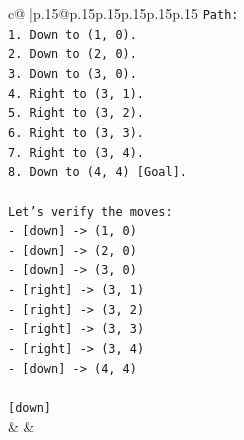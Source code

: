 \documentclass{article}
\begin{document}
{\begin{supertabular}{c@{$\;$}|p{.15\linewidth}@{}p{.15\linewidth}p{.15\linewidth}p{.15\linewidth}p{.15\linewidth}p{.15\linewidth}}
{{{\texttt{Path:} \\
\texttt{1. Down to (1, 0).} \\
\texttt{2. Down to (2, 0).} \\
\texttt{3. Down to (3, 0).} \\
\texttt{4. Right to (3, 1).} \\
\texttt{5. Right to (3, 2).} \\
\texttt{6. Right to (3, 3).} \\
\texttt{7. Right to (3, 4).} \\
\texttt{8. Down to (4, 4) {[}Goal{]}.} \\
\\ 
\texttt{Let's verify the moves:} \\
\texttt{{-} {[}down{]} {-}> (1, 0)} \\
\texttt{{-} {[}down{]} {-}> (2, 0)} \\
\texttt{{-} {[}down{]} {-}> (3, 0)} \\
\texttt{{-} {[}right{]} {-}> (3, 1)} \\
\texttt{{-} {[}right{]} {-}> (3, 2)} \\
\texttt{{-} {[}right{]} {-}> (3, 3)} \\
\texttt{{-} {[}right{]} {-}> (3, 4)} \\
\texttt{{-} {[}down{]} {-}> (4, 4)} \\
\\ 
\texttt{{[}down{]}} \\
            }
        }
    }
    & & \\ \\


\end{supertabular}}
\end{document}

